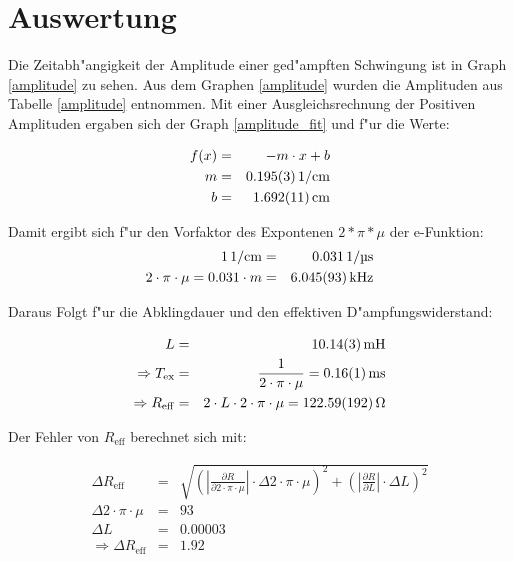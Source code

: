 \section{Auswertung}
	\label{sec:auswertung}
	

	Die Zeitabh"angigkeit der Amplitude einer ged"ampften Schwingung ist in Graph \eqref{amplitude} zu sehen.
	Aus dem Graphen \eqref{amplitude} wurden die Amplituden aus Tabelle \eqref{amplitude} entnommen. Mit einer Ausgleichsrechnung der Positiven Amplituden ergaben sich der Graph \eqref{amplitude_fit} und f"ur die Werte:

	\begin{eqnarray}
		f(x) &=& -m \cdot x + b\\ \label{ausgleich}
		m &=& \SI{0.195 (3)}{1\per\centi\meter} \nonumber\\
		b &=& \SI{1.692 (11)}{\centi\meter}\nonumber 
	\end{eqnarray}

	Damit ergibt sich f"ur den Vorfaktor des Expontenen $2*\pi*\mu$ der e-Funktion: 
	\begin{eqnarray*}
		\SI{1}{1\per\centi\meter} &=& \SI{0.031}{1\per\micro\second}\\
		2\cdot \pi \cdot \mu  = 0.031 \cdot m &=&  \SI{6.045 (93)}{\kilo \hertz}
	\end{eqnarray*}

	Daraus Folgt f"ur die Abklingdauer und den effektiven D"ampfungswiderstand:

	\begin{eqnarray*}
		L &=& \SI{10.14 (3)}{\milli \henry }\\
		\Rightarrow T_\mathrm{ex} &=& \frac{1}{2 \cdot \pi \cdot \mu} = \SI{0.16 (1)}{\milli \second}\\
		\Rightarrow R_\mathrm{eff} &=& 2 \cdot L \cdot 2 \cdot \pi \cdot \mu = \SI{122.59 (192)}{\ohm}
	\end{eqnarray*}

	Der Fehler von $R_\mathrm{eff}$ berechnet sich mit:

	\begin{eqnarray*}
		\Delta R_\mathrm{eff} &=& \sqrt{ \left( |\frac{\partial R}{\partial 2 \cdot \pi \cdot \mu}| \cdot \Delta 2 \cdot \pi \cdot \mu \right)^2 + \left( |\frac{\partial R}{\partial L}| \cdot \Delta L \right)^2}\\ \label{fehler}
		\Delta 2 \cdot \pi \cdot \mu &=& 93\\
		\Delta L &=& 0.00003\\
		\Rightarrow \Delta R_\mathrm{eff} &=& 1.92
	\end{eqnarray*}

